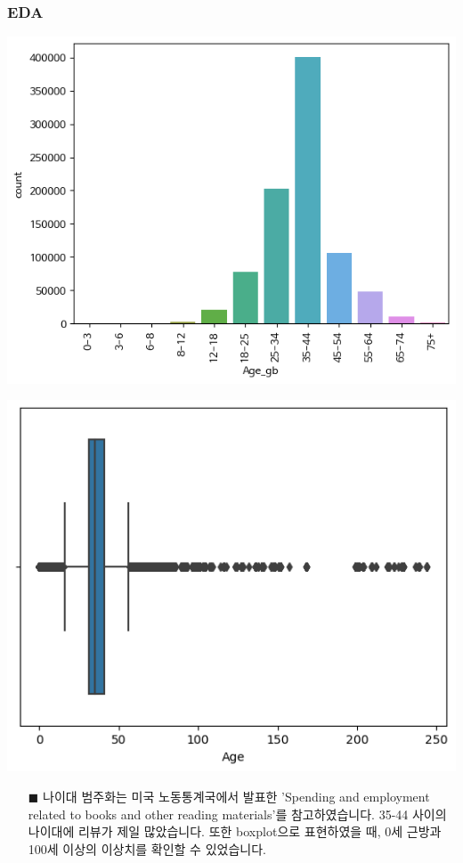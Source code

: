 \documentclass{beamer}
\begin{document}

\begin{frame}
\frametitle{EDA}

\centering
\begin{minipage}{.5\textwidth}
  \centering
  \includegraphics[scale=0.4]{age_gb.png}
\end{minipage}%
\begin{minipage}{.5\textwidth}
  \centering
  \includegraphics[scale=0.38]{AGE BOXPLOT.png}
\end{minipage}

\begin{itemize}
\item[$\blacksquare$] {\footnotesize 나이대 범주화는 미국 노동통계국에서 발표한 'Spending and employment related to books and other reading materials'를 참고하였습니다. 35-44 사이의 나이대에 리뷰가 제일 많았습니다. 또한 boxplot으로 표현하였을 때, 0세 근방과 100세 이상의 이상치를 확인할 수 있었습니다.} 

\end{itemize}
\end{frame}
\end{document}
